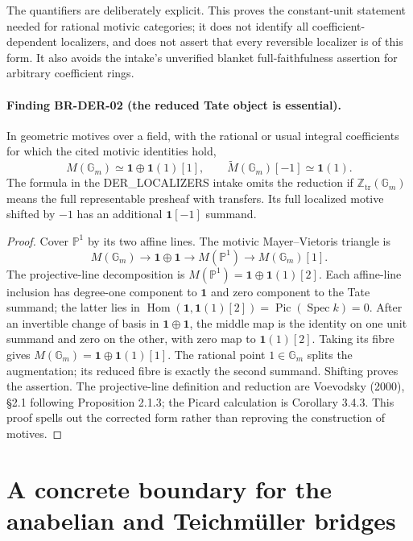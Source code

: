 \documentclass[11pt,a4paper]{article}
\theoremstyle{definition}\newtheorem{definition}[theorem]{Definition}
\theoremstyle{remark}\newtheorem{remark}[theorem]{Remark}
\begin{document}
The quantifiers are deliberately explicit.  This proves the
constant-unit statement needed for rational motivic categories;
it does not identify all coefficient-dependent localizers, and
does not assert that every reversible localizer is of this form.
It also avoids the intake's unverified blanket full-faithfulness
assertion for arbitrary coefficient rings.

\paragraph{Finding BR-DER-02 (the reduced Tate object is essential).}
In geometric motives over a field, with the rational or usual
integral coefficients for which the cited motivic identities hold,
\[
 M(\mathbb G_m)\simeq\mathbf1\oplus\mathbf1(1)[1],\qquad
 \widetilde M(\mathbb G_m)[-1]\simeq\mathbf1(1).
\]
The formula in the DER\_LOCALIZERS intake omits the reduction if
$\mathbb Z_{\mathrm{tr}}(\mathbb G_m)$ means the full representable
presheaf with transfers.  Its full localized motive shifted by
$-1$ has an additional $\mathbf1[-1]$ summand.

\begin{proof}
Cover $\mathbb P^1$ by its two affine lines.  The motivic
Mayer--Vietoris triangle is
\[
 M(\mathbb G_m)\longrightarrow\mathbf1\oplus\mathbf1
 \longrightarrow M(\mathbb P^1)\longrightarrow M(\mathbb G_m)[1].
\]
The projective-line decomposition is
$M(\mathbb P^1)=\mathbf1\oplus\mathbf1(1)[2]$.
Each affine-line inclusion has degree-one component to
$\mathbf1$ and zero component to the Tate summand; the latter
lies in $\operatorname{Hom}(\mathbf1,\mathbf1(1)[2])
=\operatorname{Pic}(\operatorname{Spec}k)=0$.
After an invertible change of basis in $\mathbf1\oplus\mathbf1$,
the middle map is the identity on one unit summand and zero on
the other, with zero map to $\mathbf1(1)[2]$.  Taking its fibre
gives $M(\mathbb G_m)=\mathbf1\oplus\mathbf1(1)[1]$.
The rational point $1\in\mathbb G_m$ splits the augmentation;
its reduced fibre is exactly the second summand.  Shifting proves
the assertion.  The projective-line definition and reduction are
Voevodsky (2000), \S2.1 following Proposition 2.1.3; the Picard
calculation is Corollary 3.4.3.  This proof spells out the corrected
form rather than reproving the construction of motives.
\end{proof}

\section{A concrete boundary for the anabelian and Teichm\"uller bridges}
\label{sec:root-anabelian}
\end{document}
